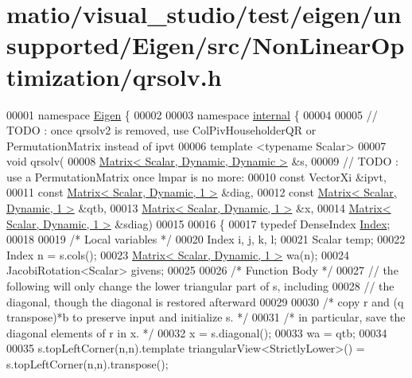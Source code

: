 \hypertarget{matio_2visual__studio_2test_2eigen_2unsupported_2_eigen_2src_2_non_linear_optimization_2qrsolv_8h_source}{}\section{matio/visual\+\_\+studio/test/eigen/unsupported/\+Eigen/src/\+Non\+Linear\+Optimization/qrsolv.h}
\label{matio_2visual__studio_2test_2eigen_2unsupported_2_eigen_2src_2_non_linear_optimization_2qrsolv_8h_source}

\begin{DoxyCode}
00001 \textcolor{keyword}{namespace }\hyperlink{namespace_eigen}{Eigen} \{ 
00002 
00003 \textcolor{keyword}{namespace }\hyperlink{namespaceinternal}{internal} \{
00004 
00005 \textcolor{comment}{// TODO : once qrsolv2 is removed, use ColPivHouseholderQR or PermutationMatrix instead of ipvt}
00006 \textcolor{keyword}{template} <\textcolor{keyword}{typename} Scalar>
00007 \textcolor{keywordtype}{void} qrsolv(
00008         \hyperlink{group___core___module}{Matrix< Scalar, Dynamic, Dynamic >} &s,
00009         \textcolor{comment}{// TODO : use a PermutationMatrix once lmpar is no more:}
00010         \textcolor{keyword}{const} VectorXi &ipvt,
00011         \textcolor{keyword}{const} \hyperlink{group___core___module}{Matrix< Scalar, Dynamic, 1 >}  &diag,
00012         \textcolor{keyword}{const} \hyperlink{group___core___module}{Matrix< Scalar, Dynamic, 1 >}  &qtb,
00013         \hyperlink{group___core___module}{Matrix< Scalar, Dynamic, 1 >}  &x,
00014         \hyperlink{group___core___module}{Matrix< Scalar, Dynamic, 1 >}  &sdiag)
00015 
00016 \{
00017     \textcolor{keyword}{typedef} DenseIndex \hyperlink{namespace_eigen_a62e77e0933482dafde8fe197d9a2cfde}{Index};
00018 
00019     \textcolor{comment}{/* Local variables */}
00020     Index i, j, k, l;
00021     Scalar temp;
00022     Index n = s.cols();
00023     \hyperlink{group___core___module}{Matrix< Scalar, Dynamic, 1 >}  wa(n);
00024     JacobiRotation<Scalar> givens;
00025 
00026     \textcolor{comment}{/* Function Body */}
00027     \textcolor{comment}{// the following will only change the lower triangular part of s, including}
00028     \textcolor{comment}{// the diagonal, though the diagonal is restored afterward}
00029 
00030     \textcolor{comment}{/*     copy r and (q transpose)*b to preserve input and initialize s. */}
00031     \textcolor{comment}{/*     in particular, save the diagonal elements of r in x. */}
00032     x = s.diagonal();
00033     wa = qtb;
00034 
00035     s.topLeftCorner(n,n).template triangularView<StrictlyLower>() = s.topLeftCorner(n,n).transpose();

\end{DoxyCode}
